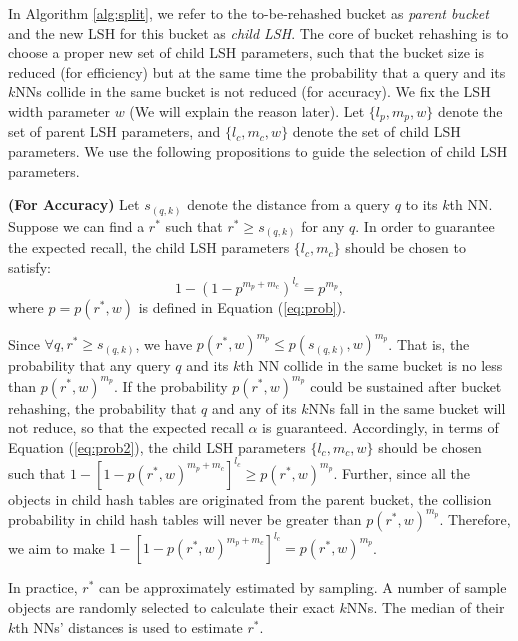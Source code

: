 In Algorithm \ref{alg:split}, we refer to the to-be-rehashed bucket as \emph{parent bucket} and the new LSH for this bucket as \emph{child LSH}. The core of bucket rehashing is to choose a proper new set of child LSH parameters, such that the bucket size is reduced (for efficiency) but at the same time the probability that a query and its $k$NNs collide in the same bucket is not reduced (for accuracy). We fix the LSH width parameter $w$ (We will explain the reason later). Let $\{l_p,m_p,w\}$ denote the set of parent LSH parameters, and $\{l_c,m_c,w\}$ denote the set of child LSH parameters. We use the following propositions to guide the selection of child LSH parameters.

\begin{prop}
\label{prop:accuracy}
\textbf{(For Accuracy)} Let $s_{(q,k)}$ denote the distance from a query $q$ to its $k$th NN. Suppose we can find a $r^*$ such that $r^*\geq s_{(q,k)}$ for any $q$. In order to guarantee the expected recall, the child LSH parameters $\{l_c,m_c\}$ should be chosen to satisfy:
\begin{equation}\label{eq:sustainprob}
    1-(1-p^{m_p+m_{c}})^{l_{c}}=p^{m_{p}},
\end{equation}
where $p=p(r^*,w)$ is defined in Equation (\ref{eq:prob}).
\end{prop}
\begin{IEEEproof}
Since $\forall q, r^*\geq s_{(q,k)}$, we have $p(r^*,w)^{m_p}\leq p(s_{(q,k)},w)^{m_p}$. That is, the probability that any query $q$ and its $k$th NN collide in the same bucket is no less than $p(r^*,w)^{m_p}$. If the probability $p(r^*,w)^{m_p}$ could be sustained after bucket rehashing, the probability that $q$ and any of its $k$NNs fall in the same bucket will not reduce, so that the expected recall $\alpha$ is guaranteed. Accordingly, in terms of Equation (\ref{eq:prob2}), the child LSH parameters $\{l_c,m_c,w\}$ should be chosen such that $1-[1-p(r^*,w)^{m_p+m_{c}}]^{l_{c}}\geq p(r^*,w)^{m_{p}}$. Further, since all the objects in child hash tables are originated from the parent bucket, the collision probability in child hash tables will never be greater than $p(r^*,w)^{m_{p}}$. Therefore, we aim to make $1-[1-p(r^*,w)^{m_p+m_{c}}]^{l_{c}}=p(r^*,w)^{m_{p}}$.
\end{IEEEproof}

In practice, $r^*$ can be approximately estimated by sampling. A number of sample objects are randomly selected to calculate their exact $k$NNs. The median of their $k$th NNs' distances is used to estimate $r^*$.

